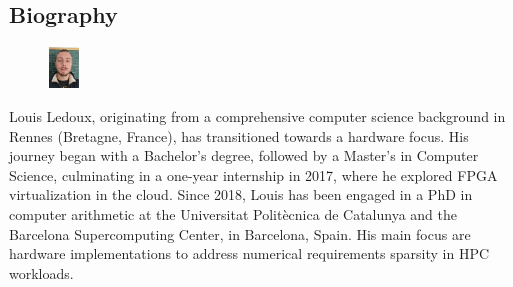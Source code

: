 \subsection{Biography}
\label{sec:biography}

\begin{figure} %
\centering
\includegraphics[width=0.07\textwidth]{./figures/louis2.jpg}
\end{figure}
Louis Ledoux, originating from a comprehensive computer science background in Rennes (Bretagne, France), has transitioned towards a hardware focus.
His journey began with a Bachelor's degree, followed by a Master's in Computer Science, culminating in a one-year internship in 2017, where he explored FPGA virtualization in the cloud.
Since 2018, Louis has been engaged in a PhD in computer arithmetic at the Universitat Polit\`ecnica de Catalunya and the Barcelona Supercomputing Center, in Barcelona, Spain.
His main focus are hardware implementations to address numerical requirements sparsity in HPC workloads.

